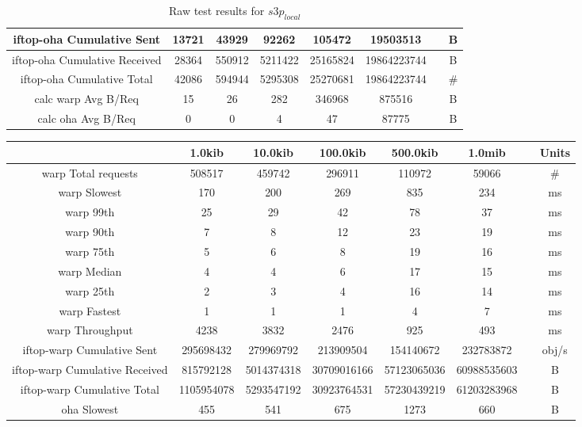\begin{sidewaystable}
\begin{tabular}{|c|c|c|c|c|c|c|c|}
		\hline
		iftop-oha Cumulative Sent & 13721 & 43929 & 92262 & 105472 & 19503513 &  & B \\
		\hline
		iftop-oha Cumulative Received & 28364 & 550912 & 5211422 & 25165824 & 19864223744 &  & B \\
		\hline
		iftop-oha Cumulative Total & 42086 & 594944 & 5295308 & 25270681 & 19864223744 &  & \# \\
		\hline
		calc warp Avg B/Req & 15 & 26 & 282 & 346968 & 875516 &  & B \\
		\hline
		calc oha Avg B/Req & 0 & 0 & 4 & 47 & 87775 &  & B \\
		\hline
	\end{tabular}
	\caption{Raw test results for ${s3p}_{local}$}
\end{sidewaystable}

\begin{sidewaystable}
		\begin{tabular}{|c|c|c|c|c|c|c|c|}
			\hline
			& 1.0kib & 10.0kib & 100.0kib & 500.0kib & 1.0mib &  & Units \\
			\hline
			warp Total requests & 508517 & 459742 & 296911 & 110972 & 59066 &  & \# \\
			\hline
			warp Slowest & 170 & 200 & 269 & 835 & 234 &  & ms \\
			\hline
			warp 99th & 25 & 29 & 42 & 78 & 37 &  & ms \\
			\hline
			warp 90th & 7 & 8 & 12 & 23 & 19 &  & ms \\
			\hline
			warp 75th & 5 & 6 & 8 & 19 & 16 &  & ms \\
			\hline
			warp Median & 4 & 4 & 6 & 17 & 15 &  & ms \\
			\hline
			warp 25th & 2 & 3 & 4 & 16 & 14 &  & ms \\
			\hline
			warp Fastest & 1 & 1 & 1 & 4 & 7 &  & ms \\
			\hline
			warp Throughput & 4238 & 3832 & 2476 & 925 & 493 &  & ms \\
			\hline
			iftop-warp Cumulative Sent & 295698432 & 279969792 & 213909504 & 154140672 & 232783872 &  & obj/s \\
			\hline
			iftop-warp Cumulative Received & 815792128 & 5014374318 & 30709016166 & 57123065036 & 60988535603 &  & B \\
			\hline
			iftop-warp Cumulative Total & 1105954078 & 5293547192 & 30923764531 & 57230439219 & 61203283968 &  & B \\
			\hline
			oha Slowest & 455 & 541 & 675 & 1273 & 660 &  & B \\

\end{tabular}
\end{sidewaystable}
